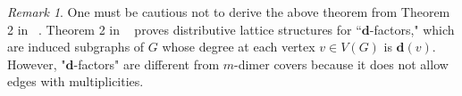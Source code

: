 \documentclass[11pt]{amsart}
\theoremstyle{definition}
\theoremstyle{remark}
\newtheorem{exmp}[thm]{Example}
\newtheorem{rem}[thm]{Remark}
\numberwithin{equation}{section}
\begin{document}
\begin{rem}
    One must be cautious not to derive the above theorem from Theorem 2 in ~\cite{proppDimerThy}. Theorem 2 in ~\cite{proppDimerThy} proves distributive lattice structures for ``$\mathbf{d}$-factors," which are induced subgraphs of $G$ whose degree at each vertex $v\in V(G)$ is $\mathbf{d}(v)$. However, "$\mathbf{d}$-factors" are different from $m$-dimer covers because it does not allow edges with multiplicities.
\end{rem}

\end{document}
